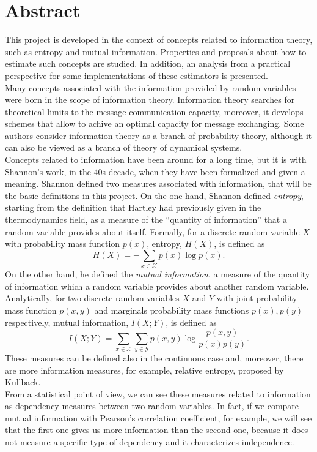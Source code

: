 \chapter*{Abstract}

This project is developed in the context of concepts related to information theory, such as entropy and mutual information. Properties and proposals about how to estimate such concepts are studied. In addition, an analysis from a practical perspective for some implementations of these estimators is presented.\\

Many concepts associated with the information provided by random
variables were born in the scope of information theory. Information theory searches for theoretical limits to the message communication capacity, moreover, it develops schemes that allow to achive an optimal capacity for message exchanging. Some authors consider information theory as a branch of probability theory, although it can also be viewed as a branch of theory of dynamical systems.\\

Concepts related to information have been around for a long time, but it is with Shannon's work, in the 40s decade, when they have been formalized and given a meaning. Shannon defined two measures associated with information, that will be the basic definitions in this project. On the one hand, Shannon defined \textit{entropy}, starting from the definition that Hartley had previously given in the thermodynamics field, as a measure of the ``quantity of information'' that a random variable provides about itself. Formally, for a discrete random variable $X$ with probability mass function $p(x)$, entropy, $H(X)$, is defined as\[
H(X) = - \sum_{x\in\mathcal{X}}p(x)\log p(x).
\]
On the other hand, he defined the \textit{mutual information}, a measure of the quantity of information which a random variable provides about another random variable. Analytically, for two discrete random variables $X$ and $Y$ with joint probability mass function $p(x,y)$ and marginals probability mass functions $p(x), p(y)$ respectively, mutual information, $I(X;Y)$, is defined as\[
I(X;Y) = \sum_{x\in\mathcal{X}}\sum_{y\in\mathcal{Y}}p(x,y)\log \frac{p(x,y)}{p(x)p(y)}.
\]
These measures can be defined also in the continuous case and, moreover, there are more information measures, for example, relative entropy, proposed by Kullback.\\

From a statistical point of view, we can see these measures related to information as dependency measures between two random variables. In fact, if we compare mutual information with Pearson's correlation coefficient, for example, we will see that the first one gives us more information than the second one, because it does not measure a specific type of dependency and it characterizes independence.\\

